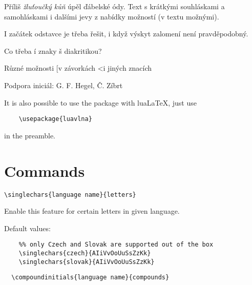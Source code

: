 \documentclass[12pt]{ltxdoc}
\begin{document}

\noindent
\begin{minipage}{3in}
\preventsingledebugon
{}
Příliš \textit{žluťoučký kůň} úpěl ďábelské ódy. 
Text s krátkými souhláskami a samohláskami i dalšími jevy z nabídky možností (v textu možnými). 

I začátek odstavce je třeba řešit, i když výskyt zalomení není pravděpodobný.

Co třeba í znaky š diakritikou?

Různé možnosti [v závorkách \textless i jiných znacích

Podpora iniciál: G. F. Hegel, Č. Zíbrt

\preventsingledebugoff
\end{minipage}

\bigskip
It is also possible to use the package with lua\LaTeX, just use

\begin{verbatim}
	\usepackage{luavlna}
\end{verbatim}

in the preamble.

\section{Commands}

\begin{verbatim}
\singlechars{language name}{letters} 
\end{verbatim}

Enable this feature for certain letters in given language. 

Default values:

\begin{verbatim}
	%% only Czech and Slovak are supported out of the box
	\singlechars{czech}{AIiVvOoUuSsZzKk}
	\singlechars{slovak}{AIiVvOoUuSsZzKk}
\end{verbatim}



\begin{verbatim}
  \compoundinitials{language name}{compounds}
\end{verbatim}
\end{document}
